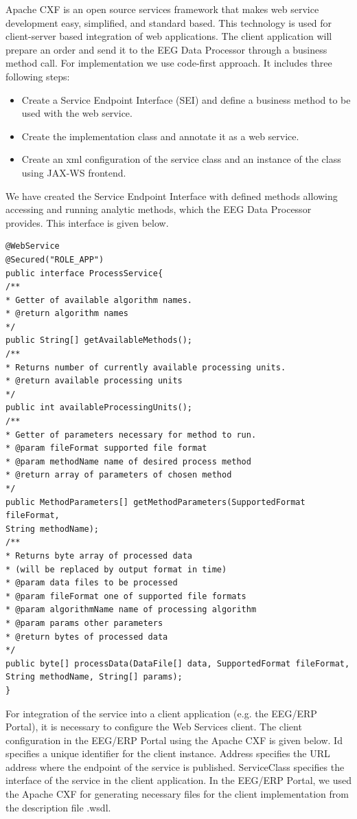 \documentclass{frontiersSCNS} %
\begin{document}
Apache CXF \cite{CXF} is an open source services framework that makes web service development easy, simplified, and standard based. This technology is used for client-server based integration of web applications. The client application will prepare an order and send it to the EEG Data Processor through a business method call. For implementation we use code-first approach. It includes three following steps:

\begin{itemize}
\item Create a Service Endpoint Interface (SEI) and define a business method to be used with the web service.
\item Create the implementation class and annotate it as a web service.
\item Create an xml configuration of the service class and an instance of the class using JAX-WS frontend.

\end{itemize}

We have created the Service Endpoint Interface with defined methods allowing accessing and running analytic methods, which the EEG Data Processor provides. This interface is given below.

\begin{small}
\begin{verbatim}
@WebService
@Secured("ROLE_APP")
public interface ProcessService{
/**
* Getter of available algorithm names.
* @return algorithm names
*/
public String[] getAvailableMethods();
/**
* Returns number of currently available processing units.
* @return available processing units
*/
public int availableProcessingUnits();
/**
* Getter of parameters necessary for method to run.
* @param fileFormat supported file format
* @param methodName name of desired process method
* @return array of parameters of chosen method
*/
public MethodParameters[] getMethodParameters(SupportedFormat fileFormat, 
String methodName);
/**
* Returns byte array of processed data
* (will be replaced by output format in time)
* @param data files to be processed
* @param fileFormat one of supported file formats
* @param algorithmName name of processing algorithm
* @param params other parameters
* @return bytes of processed data
*/
public byte[] processData(DataFile[] data, SupportedFormat fileFormat, 
String methodName, String[] params);
}
\end{verbatim}
\end{small}

For integration of the service into a client application (e.g. the EEG/ERP Portal), it is necessary to configure the Web Services client. The client configuration in the EEG/ERP Portal using the Apache CXF is given below. Id specifies a unique identifier for the client instance. Address specifies the URL address where the endpoint of the service is published. ServiceClass specifies the interface of the service in the client application. In the EEG/ERP Portal, we used the Apache CXF for generating necessary files for the client implementation from the description file .wsdl.
\end{document}
